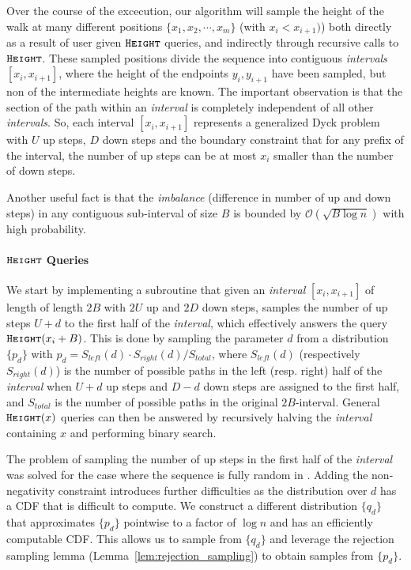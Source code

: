 Over the course of the excecution, our algorithm will sample the height of the walk at many different positions $\{ x_1, x_2,\cdots, x_m\}$
(with $x_i<x_{i+1})$) both directly as a result of user given $\texttt{\textsc{Height}}$ queries, and indirectly through recursive calls to $\texttt{\textsc{Height}}$.
These sampled positions divide the sequence into contiguous \emph{intervals} $[x_i,x_{i+1}]$,
where the height of the endpoints $y_i, y_{i+1}$ have been sampled, but non of the intermediate heights are known.
The important observation is that the section of the path within an \emph{interval} is completely independent of all other \emph{intervals}.
So, each interval $[x_i,x_{i+1}]$ represents a generalized Dyck problem with $U$ up steps, $D$ down steps and the boundary constraint that
for any prefix of the interval, the number of up steps can be at most $x_i$ smaller than the number of down steps.

Another useful fact is that the \emph{imbalance} (difference in number of up and down steps) in any contiguous sub-interval of size $B$
is bounded by $\mathcal O(\sqrt{B\log n})$ with high probability.

\paragraph*{$\texttt{\textsc{Height}}$ Queries}
\label{par:height_queries}
We start by implementing a subroutine that given an \emph{interval} $[x_i,x_{i+1}]$ of length of length $2B$ with $2U$ up and $2D$ down steps,
samples the number of up steps $U+d$ to the first half of the \emph{interval}, which effectively answers the query $\texttt{\textsc{Height}}(x_i+B)$.
This is done by sampling the parameter $d$ from a distribution $\{ p_d\}$ with $p_d = S_{left}(d)\cdot S_{right}(d)/S_{total}$,
where $S_{left}(d)$ (respectively $S_{right}(d)$) is the number of possible paths in the left (resp. right) half of the \emph{interval} when
$U+d$ up steps and $D-d$ down steps are assigned to the first half, and $S_{total}$ is the number of possible paths in the original $2B$-interval.
General $\texttt{\textsc{Height}}(x)$ queries can then be answered by recursively halving the \emph{interval} containing $x$ and performing binary search.

The problem of sampling the number of up steps in the first half of the \emph{interval} was solved for the case where the sequence is fully random
in \cite{huge}.
Adding the non-negativity constraint introduces further difficulties as the distribution over $d$ has a CDF that is difficult to compute.
We construct a different distribution $\{q_d\}$ that approximates $\{p_d\}$ pointwise to a factor of $\log n$ and has an efficiently computable CDF.
This allows us to sample from $\{q_d\}$ and leverage the rejection sampling lemma (Lemma~\ref{lem:rejection_sampling}) to obtain samples from $\{p_d\}$.

